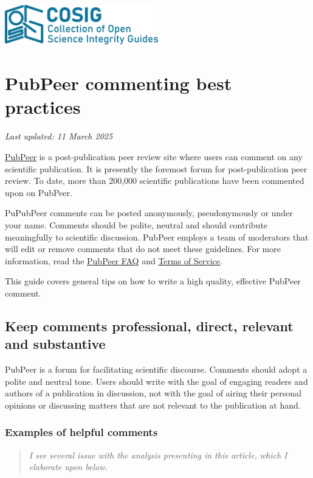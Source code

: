\documentclass[letterpaper, 12pt]{article}
\begin{document}
\flushleft
\includegraphics[width=0.5\textwidth]{img/home/241017_final_logo_mockup.png}

\section*{PubPeer commenting best practices}
\textit{Last updated: 11 March 2025}

\href{https://pubpeer.com/}{PubPeer} is a post-publication peer review site where users can comment on any scientific publication. It is presently the foremost forum for post-publication peer review. To date, more than 200,000 scientific publications have been commented upon on PubPeer.

PuPubPeer comments can be posted anonymously, pseudonymously or under your name. Comments should be polite, neutral and should contribute meaningfully to scientific discussion. PubPeer employs a team of moderators that will edit or remove comments that do not meet these guidelines. For more information, read the \href{https://pubpeer.com/static/faq}{PubPeer FAQ} and \href{https://pubpeer.com/static/tos}{Terms of Service}.

This guide covers general tips on how to write a high quality, effective PubPeer comment.

\subsection*{Keep comments professional, direct, relevant and substantive}

PubPeer is a forum for facilitating scientific discourse. Comments should adopt a polite and neutral tone. Users should write with the goal of engaging readers and authors of a publication in discussion, not with the goal of airing their personal opinions or discussing matters that are not relevant to the publication at hand.

\subsubsection*{Examples of helpful comments}

\begin{quote}
    \textit{I see several issue with the analysis presenting in this article, which I elaborate upon below.}
\end{quote}
\end{document}
